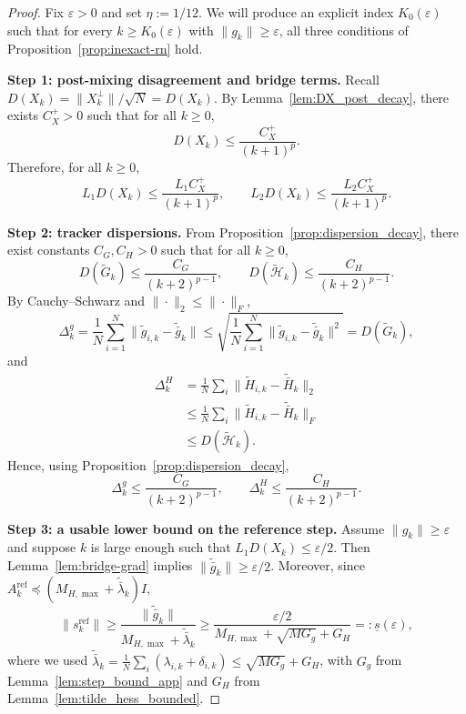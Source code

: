 \documentclass[review,onefignum,onetabnum]{siamart171218}
\begin{document}
\begin{proof}
Fix $\varepsilon>0$ and set $\eta:=1/12$.
We will produce an explicit index $K_0(\varepsilon)$ such that for every $k\ge K_0(\varepsilon)$ with $\|g_k\|\ge \varepsilon$,
all three conditions of Proposition~\ref{prop:inexact-rn} hold.

\smallskip
\noindent\textbf{Step 1: post-mixing disagreement and bridge terms.}
Recall $D(X_k)=\|X_k^\perp\|/\sqrt N = D(X_k)$.
By Lemma~\ref{lem:DX_post_decay}, there exists $C_X^{+}>0$ such that for all $k\ge 0$,
\begin{equation}\label{eq:DX_post_decay_app}
D(X_k)\le \frac{C_X^{+}}{(k+1)^p}.
\end{equation}
Therefore, for all $k\ge 0$,
\begin{equation}\label{eq:bridge_targets_app}
L_1D(X_k)\le \frac{L_1C_X^{+}}{(k+1)^p},
\qquad
L_2D(X_k)\le \frac{L_2C_X^{+}}{(k+1)^p}.
\end{equation}

\smallskip
\noindent\textbf{Step 2: tracker dispersions.}
From Proposition~\ref{prop:dispersion_decay}, there exist constants $C_G,C_H>0$ such that for all $k\ge 0$,
\begin{equation}\label{eq:GH_decay_app}
D(\tilde G_k)\le \frac{C_G}{(k+2)^{p-1}},
\qquad
D(\tilde{\mathcal H}_k)\le \frac{C_H}{(k+2)^{p-1}}.
\end{equation}
By Cauchy--Schwarz and $\|\cdot\|_2\le \|\cdot\|_F$,
\[
\Delta_k^g
=\frac1N\sum_{i=1}^N\|\tilde g_{i,k}-\tilde{\bar g}_k\|
\le \sqrt{\frac1N\sum_{i=1}^N\|\tilde g_{i,k}-\tilde{\bar g}_k\|^2}
= D(\tilde G_k),
\]
and
\begin{align*}
\Delta_k^H
&=\tfrac1N\textstyle\sum_{i}\big\|\tilde H_{i,k}\!-\!\tilde{\bar H}_k\big\|_2\\
&\le \tfrac1N\textstyle\sum_{i}\big\|\tilde H_{i,k}\!-\!\tilde{\bar H}_k\big\|_F\\
&\le D(\tilde{\mathcal H}_k).
\end{align*}
Hence, using Proposition~\ref{prop:dispersion_decay},
\begin{equation}\label{eq:Delta_decay_app}
\Delta_k^g\le \frac{C_G}{(k+2)^{p-1}},
\qquad
\Delta_k^H\le \frac{C_H}{(k+2)^{p-1}}.
\end{equation}

\smallskip
\noindent\textbf{Step 3: a usable lower bound on the reference step.}
Assume $\|g_k\|\ge \varepsilon$ and suppose $k$ is large enough such that $L_1D(X_k)\le \varepsilon/2$.
Then Lemma~\ref{lem:bridge-grad} implies
$\|\tilde{\bar g}_k\|\ge \varepsilon/2$.
Moreover, since $A_k^{\mathrm{ref}}\preceq (M_{H,\max}+\tilde{\bar\lambda}_k)I$,
\[
\|s_k^{\mathrm{ref}}\|
\ge \frac{\|\tilde{\bar g}_k\|}{M_{H,\max}+\tilde{\bar\lambda}_k}
\ge \frac{\varepsilon/2}{M_{H,\max}+\sqrt{MG_g}+G_H}
=:\underline s(\varepsilon),
\]
where we used $\tilde{\bar\lambda}_k=\frac{1}{N}\sum_i(\lambda_{i,k}+\delta_{i,k})\le \sqrt{MG_g}+G_H$, with $G_g$ from Lemma~\ref{lem:step_bound_app} and $G_H$ from Lemma~\ref{lem:tilde_hess_bounded}.


\end{proof}
\end{document}
